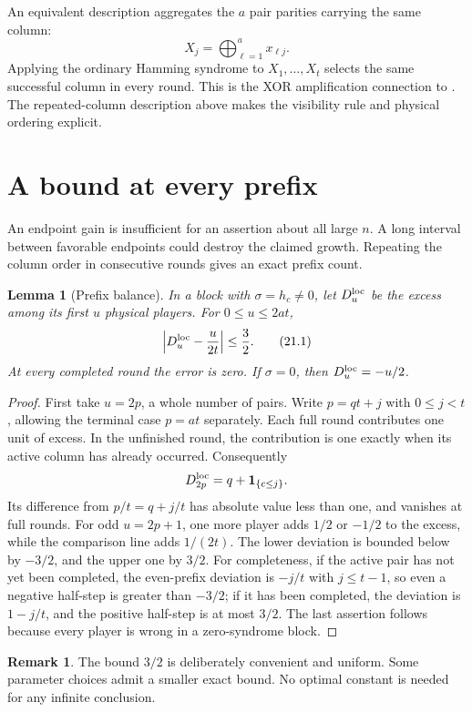 \documentclass[11pt,letterpaper]{article}
\newtheorem{lemma}[theorem]{Lemma}
\theoremstyle{definition}
\newtheorem{remark}[theorem]{Remark}
\newcommand{\ind}{\mathbf 1}
\begin{document}
An equivalent description aggregates the \(a\) pair parities carrying
the same column:
\[
  X_j=\bigoplus_{\ell=1}^a x_{\ell j}.
\]
Applying the ordinary Hamming syndrome to \(X_1,\ldots,X_t\) selects
the same successful column in every round. This is the XOR
amplification connection to \cite{hat:EMV}. The repeated-column description
above makes the visibility rule and physical ordering explicit.

\section{A bound at every prefix}
\label{mbg:hat:sec:prefix}

An endpoint gain is insufficient for an assertion about all large
\(n\). A long interval between favorable endpoints could destroy
the claimed growth. Repeating the column order in consecutive rounds
gives an exact prefix count.

\begin{lemma}[Prefix balance]\label{mbg:hat:lem:prefix}
In a block with \(\sigma=h_c\ne0\), let \(D^{\rm loc}_u\) be the
excess among its first \(u\) physical players. For \(0\le u\le2at\),
\[
  \left|D^{\rm loc}_u-\frac{u}{2t}\right|\le\frac32.           \tag{21.1}\label{mbg:hat:eq:prefix}
\]
At every completed round the error is zero.
If \(\sigma=0\), then \(D^{\rm loc}_u=-u/2\).
\end{lemma}
\begin{proof}
First take \(u=2p\), a whole number of pairs. Write \(p=qt+j\)
with \(0\le j<t\), allowing the terminal case \(p=at\) separately.
Each full round contributes one unit of excess. In the unfinished
round, the contribution is one exactly when its active column has
already occurred. Consequently
\[
  D^{\rm loc}_{2p}=q+\ind_{\{c\le j\}}.
\]
Its difference from \(p/t=q+j/t\) has absolute value less than one,
and vanishes at full rounds. For odd \(u=2p+1\), one more player
adds \(1/2\) or \(-1/2\) to the excess, while the comparison line
adds \(1/(2t)\).
The lower deviation is bounded below by \(-3/2\), and the upper
one by \(3/2\). For completeness, if the active pair has not yet
been completed, the even-prefix deviation is \(-j/t\) with
\(j\le t-1\), so even a negative half-step is greater than
\(-3/2\); if it has been completed, the deviation is
\(1-j/t\), and the positive half-step is at most \(3/2\).
The last assertion follows because every player is wrong in a
zero-syndrome block.
\end{proof}

\begin{remark}
The bound \(3/2\) is deliberately convenient and uniform. Some parameter
choices admit a smaller exact bound. No optimal constant is needed for
any infinite conclusion.
\end{remark}
\end{document}
